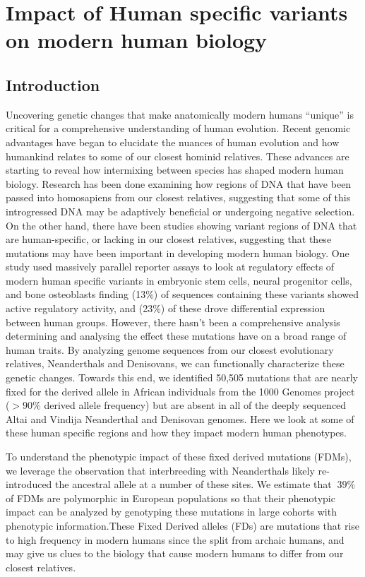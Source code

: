 \chapter{Impact of Human specific variants on modern human biology}
\section{Introduction}
Uncovering genetic changes that make anatomically modern humans “unique” is critical for a comprehensive understanding of human evolution. Recent genomic advantages have began to elucidate the nuances of human evolution and how humankind relates to some of our closest hominid relatives. These advances are starting to reveal how intermixing between species has shaped modern human biology. Research has been done examining how regions of DNA that have been passed into homosapiens from our closest relatives, suggesting that some of this introgressed DNA may be adaptively beneficial or undergoing negative selection. On the other hand, there have been studies showing variant regions of DNA that are human-specific, or lacking in our closest relatives, suggesting that these mutations may have been important in developing modern human biology. 
One study used massively parallel reporter assays to look at regulatory effects of modern human specific variants \cite{weiss2021cis} in embryonic stem cells, neural progenitor cells, and bone osteoblasts finding (13\%) of sequences containing these variants showed active regulatory activity, and (23\%) of these drove differential expression between human groups. However, there hasn't been a comprehensive analysis determining and analysing the effect these mutations have on a broad range of human traits.
By analyzing genome sequences from our closest evolutionary relatives, Neanderthals and Denisovans, we can functionally characterize these genetic changes. Towards this end, we identified 50,505 mutations that are nearly fixed for the derived allele in African individuals from the 1000 Genomes project ($>90\%$ derived allele frequency) but are absent in all of the deeply sequenced Altai and Vindija Neanderthal and Denisovan genomes. Here we look at some of these human specific regions and how they impact modern human phenotypes.

To understand the phenotypic impact of these fixed derived mutations (FDMs), we leverage the observation that interbreeding with Neanderthals likely re-introduced the ancestral allele at a number of these sites. We estimate that $~39\%$ of FDMs are polymorphic in European populations so that their phenotypic impact can be analyzed by genotyping these mutations in large cohorts with phenotypic information.These Fixed Derived alleles (FDs) are mutations that rise to high frequency  in  modern  humans  since  the  split  from  archaic humans, and may give us clues to the biology that cause modern humans to differ from our closest relatives.
